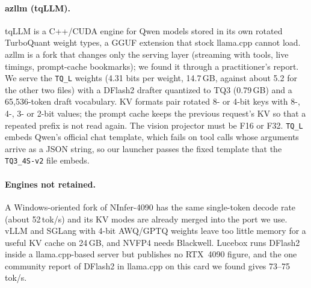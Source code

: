 \paragraph{azllm (tqLLM).}
tqLLM \citep{tqllm} is a C++/CUDA engine for Qwen models stored in its own rotated
TurboQuant weight types, a GGUF extension that stock llama.cpp cannot load. azllm \citep{azllm}
is a fork that changes only the serving layer (streaming with tools, live timings, prompt-cache
bookmarks); we found it through a practitioner's report. We serve the
\texttt{TQ\_L} weights (4.31 bits per weight, 14.7\,GB, against about 5.2 for the other two
files) with a DFlash2 drafter quantized to TQ3 (0.79\,GB) and a 65{,}536-token
draft vocabulary. KV formats pair rotated 8- or 4-bit keys with 8-, 4-, 3- or 2-bit values; the
prompt cache keeps the previous request's KV so that a repeated prefix is not read again. The
vision projector must be F16 or F32. \texttt{TQ\_L} embeds Qwen's official chat template, which
fails on tool calls whose arguments arrive as a JSON string, so our launcher passes the fixed
template that the \texttt{TQ3\_4S-v2} file embeds.

\paragraph{Engines not retained.}
A Windows-oriented fork of NInfer-4090 has the same single-token decode rate
(about 52\,tok/s) and its KV modes are already merged into the port we use. vLLM and SGLang with
4-bit AWQ/GPTQ weights leave too little memory for a useful KV cache on 24\,GB, and NVFP4 needs
Blackwell. Lucebox runs DFlash2 inside a llama.cpp-based server but publishes
no RTX~4090 figure, and the one community report of DFlash2 in llama.cpp on this card we found
gives 73--75\,tok/s.
